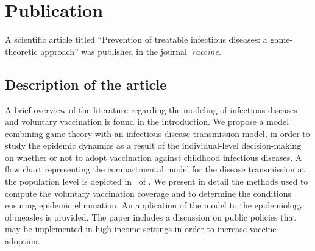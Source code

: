 %

\section{Publication}
\label{Vaccine:Article}

A scientific article titled ``Prevention of treatable infectious diseases: a game-theoretic approach'' \cite[]{Jijon2017} was published in the journal \textit{Vaccine}. %

\subsection{Description of the article}
A brief overview of the literature regarding the modeling of infectious diseases and voluntary vaccination is found in the introduction. We propose a model combining game theory with an infectious disease transmission model, in order to study the epidemic dynamics as a result of the individual-level decision-making on whether or not to adopt vaccination against childhood infectious diseases. A flow chart representing the compartmental model for the disease transmission at the population level is depicted in~ of  . We present in detail the methods used to compute the voluntary vaccination coverage and to determine the conditions ensuring epidemic elimination. 
An application of the model to the epidemiology of measles is provided. The paper includes a discussion on public policies that may be implemented in high-income settings in order to increase vaccine adoption.


